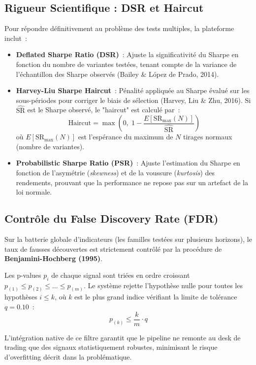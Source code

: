 \subsection{Rigueur Scientifique : DSR et Haircut}
Pour répondre définitivement au problème des tests multiples, la plateforme inclut~:
\begin{itemize}
    \item \textbf{Deflated Sharpe Ratio (DSR)}~: Ajuste la significativité du Sharpe
    en fonction du nombre de variantes testées, tenant compte de la variance de
    l'échantillon des Sharpe observés (Bailey \& López de Prado, 2014).
    \item \textbf{Harvey-Liu Sharpe Haircut}~: Pénalité appliquée au Sharpe évalué sur
    les sous-périodes pour corriger le biais de sélection (Harvey, Liu \& Zhu, 2016). Si $\widehat{\text{SR}}$
    est le Sharpe observé, le "haircut" est calculé par~:
    \begin{equation}
    \text{Haircut} = \max\left(0, \; 1 - \frac{E[\text{SR}_{\max}(N)]}{\widehat{\text{SR}}}\right)
    \end{equation}
    où $E[\text{SR}_{\max}(N)]$ est l'espérance du maximum de $N$ tirages normaux (nombre de variantes).
    \item \textbf{Probabilistic Sharpe Ratio (PSR)}~: Ajuste l'estimation du Sharpe
    en fonction de l'asymétrie (\textit{skewness}) et de la voussure (\textit{kurtosis}) des rendements,
    prouvant que la performance ne repose pas sur un artefact de la loi normale.
\end{itemize}

\subsection{Contrôle du False Discovery Rate (FDR)}
Sur la batterie globale d'indicateurs (les familles testées sur plusieurs horizons),
le taux de fausses découvertes est strictement contrôlé par la procédure de
\textbf{Benjamini-Hochberg (1995)}.

Les p-values $p_i$ de chaque signal sont triées en ordre croissant $p_{(1)} \le p_{(2)} \le \dots \le p_{(m)}$.
Le système rejette l'hypothèse nulle pour toutes les hypothèses $i \le k$,
où $k$ est le plus grand indice vérifiant la limite de tolérance $q = 0.10$~:
\begin{equation}
p_{(k)} \le \frac{k}{m} \cdot q
\end{equation}

L'intégration native de ce filtre garantit que le pipeline ne remonte au desk
de trading que des signaux statistiquement robustes, minimisant le risque
d'overfitting décrit dans la problématique.

